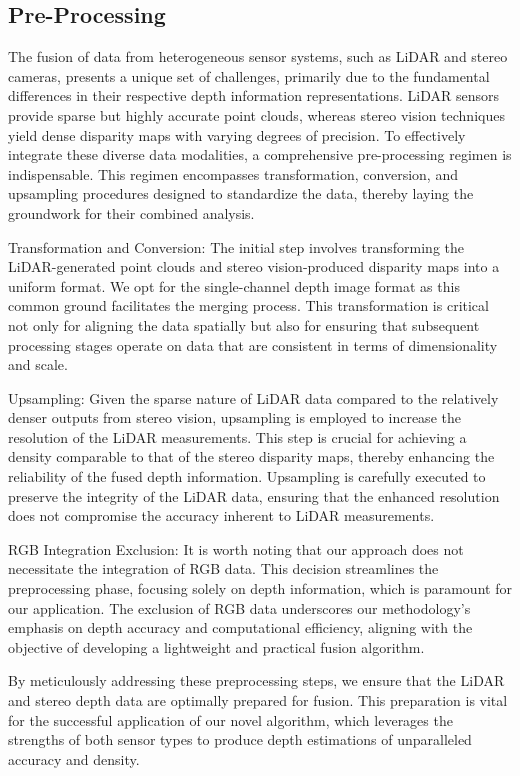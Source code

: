 \documentclass[conference]{IEEEtran}
\begin{document}
\subsection{Pre-Processing}

The fusion of data from heterogeneous sensor systems, such as LiDAR and stereo cameras, presents a unique set of challenges, primarily due to the fundamental differences in their respective depth information representations. LiDAR sensors provide sparse but highly accurate point clouds, whereas stereo vision techniques yield dense disparity maps with varying degrees of precision. To effectively integrate these diverse data modalities, a comprehensive pre-processing regimen is indispensable. This regimen encompasses transformation, conversion, and upsampling procedures designed to standardize the data, thereby laying the groundwork for their combined analysis.

Transformation and Conversion: The initial step involves transforming the LiDAR-generated point clouds and stereo vision-produced disparity maps into a uniform format. We opt for the single-channel depth image format as this common ground facilitates the merging process. This transformation is critical not only for aligning the data spatially but also for ensuring that subsequent processing stages operate on data that are consistent in terms of dimensionality and scale.

Upsampling: Given the sparse nature of LiDAR data compared to the relatively denser outputs from stereo vision, upsampling is employed to increase the resolution of the LiDAR measurements. This step is crucial for achieving a density comparable to that of the stereo disparity maps, thereby enhancing the reliability of the fused depth information. Upsampling is carefully executed to preserve the integrity of the LiDAR data, ensuring that the enhanced resolution does not compromise the accuracy inherent to LiDAR measurements.

RGB Integration Exclusion: It is worth noting that our approach does not necessitate the integration of RGB data. This decision streamlines the preprocessing phase, focusing solely on depth information, which is paramount for our application. The exclusion of RGB data underscores our methodology's emphasis on depth accuracy and computational efficiency, aligning with the objective of developing a lightweight and practical fusion algorithm.

By meticulously addressing these preprocessing steps, we ensure that the LiDAR and stereo depth data are optimally prepared for fusion. This preparation is vital for the successful application of our novel algorithm, which leverages the strengths of both sensor types to produce depth estimations of unparalleled accuracy and density.
\end{document}

